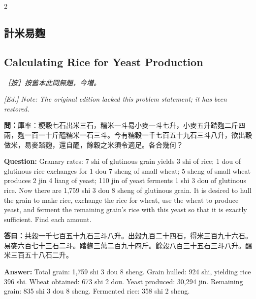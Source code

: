 \documentclass[11pt,a4paper]{article}
\newcommand{\QuestionText}[1]{\par\noindent\textbf{\color{problemcolor}問：}#1\par}
\newcommand{\AnswerText}[1]{\par\noindent\textbf{\color{answercolor}答曰：}#1\par}
\newcommand{\EdNoteText}[1]{\par\noindent\textit{\color{ednotecolor}［按］#1}\par}
\newcommand{\QuestionEn}[1]{\par\noindent\textbf{\color{problemcolor}Question:} #1\par}
\newcommand{\AnswerEn}[1]{\par\noindent\textbf{\color{answercolor}Answer:} #1\par}
\newcommand{\EdNoteEn}[1]{\par\noindent\textit{\color{ednotecolor}[Ed.] #1}\par}
\begin{document}
\begin{paracol}{2}

\subsection*{\color{sectioncolor}計米易麴}
\switchcolumn
\subsection*{\color{sectioncolor}Calculating Rice for Yeast Production}
\switchcolumn*

\EdNoteText{按舊本此問無題，今増。}
\switchcolumn
\EdNoteEn{Note: The original edition lacked this problem statement; it has been restored.}
\switchcolumn*

\QuestionText{庫率：粳榖七石出米三石，糯米一斗易小麥一斗七升，小麥五升踏麴二斤四兩，麴一百一十斤醞糯米一石三斗。今有糯穀一千七百五十九石三斗八升，欲出穀做米，易麥踏麴，還自醞，餘穀之米須令適足。各合幾何？}
\switchcolumn
\QuestionEn{Granary rates: 7 shi of glutinous grain yields 3 shi of rice; 1 dou of glutinous rice exchanges for 1 dou 7 sheng of small wheat; 5 sheng of small wheat produces 2 jin 4 liang of yeast; 110 jin of yeast ferments 1 shi 3 dou of glutinous rice. Now there are 1,759 shi 3 dou 8 sheng of glutinous grain. It is desired to hull the grain to make rice, exchange the rice for wheat, use the wheat to produce yeast, and ferment the remaining grain's rice with this yeast so that it is exactly sufficient. Find each amount.}
\switchcolumn*

\AnswerText{共穀一千七百五十九石三斗八升。出穀九百二十四石，得米三百九十六石。易麥六百七十三石二斗。踏麴三萬二百九十四斤。餘榖八百三十五石三斗八升。醞米三百五十八石二升。}
\switchcolumn
\AnswerEn{Total grain: 1,759 shi 3 dou 8 sheng. Grain hulled: 924 shi, yielding rice 396 shi. Wheat obtained: 673 shi 2 dou. Yeast produced: 30,294 jin. Remaining grain: 835 shi 3 dou 8 sheng. Fermented rice: 358 shi 2 sheng.}
\switchcolumn*


\end{paracol}
\end{document}
